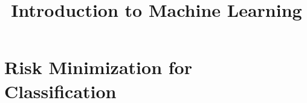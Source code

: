 




\newcommand{\titlefigure}{figure_man/optimization_steps.jpeg}
\newcommand{\learninggoals}{
\item Understand that an ML model is simply a parametrized curve
\item Understand that the hypothesis space lists all admissible models
    for a learner
\item Understand the relationship between the hypothesis space and the parameter space
}

\title{Introduction to Machine Learning}
\date{}



\section{Risk Minimization for Classification}

